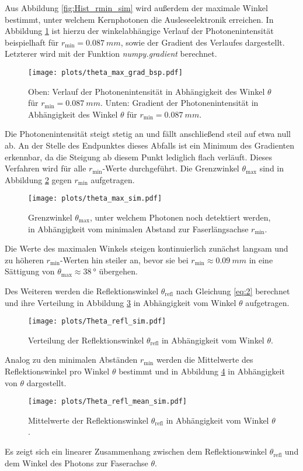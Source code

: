 Aus Abbildung \ref{fig:Hist_rmin_sim} wird außerdem der maximale Winkel bestimmt, unter welchem Kernphotonen die Ausleseelektronik erreichen. In Abbildung \ref{fig:theta_max_grad_bsp} ist hierzu der winkelabhängige Verlauf der Photonenintensität beispielhaft für $r_\mathrm{min} = \SI{0.087}{mm}$, sowie der Gradient des Verlaufes dargestellt. Letzterer wird mit der Funktion \textit{numpy.gradient} berechnet. 
\begin{figure}
    \centering
    \texttt{[image: plots/theta\_max\_grad\_bsp.pdf]}
    \caption{Oben: Verlauf der Photonenintensität in Abhängigkeit des Winkel $\theta$ für $r_\mathrm{min} = \SI{0.087}{mm}$. Unten: Gradient der Photonenintensität in Abhängigkeit des Winkel $\theta$ für $r_\mathrm{min} = \SI{0.087}{mm}$. }
    \label{fig:theta_max_grad_bsp}
\end{figure}
\FloatBarrier
Die Photonenintensität steigt stetig an und fällt anschließend steil auf etwa null ab. An der Stelle des Endpunktes dieses Abfalls ist ein Minimum des Gradienten erkennbar, da die Steigung ab diesem Punkt lediglich flach verläuft. Dieses Verfahren wird für alle $r_\mathrm{min}$-Werte durchgeführt.
Die Grenzwinkel $\theta_{\mathrm{max}}$ sind in Abbildung \ref{fig:theta_max_sim} gegen $r_{\mathrm{min}}$ aufgetragen.
\begin{figure}
    \centering
    \texttt{[image: plots/theta\_max\_sim.pdf]}
    \caption{Grenzwinkel $\theta_{\mathrm{max}}$, unter welchem Photonen noch detektiert werden, in Abhängigkeit vom minimalen Abstand zur Faserlängsachse $r_{\mathrm{min}}$. }
    \label{fig:theta_max_sim}
\end{figure}
\FloatBarrier
Die Werte des maximalen Winkels steigen kontinuierlich zunächst langsam und zu höheren $r_{\mathrm{min}}$-Werten hin steiler an, bevor sie bei $r_\mathrm{min} \approx \SI{0.09}{mm}$ in eine Sättigung von $\theta_{\mathrm{max}}\approx \SI{38}{°}$ übergehen.


Des Weiteren werden die Reflektionswinkel $\theta_{\mathrm{refl}}$ nach Gleichung \eqref{eq:2} berechnet und ihre Verteilung in Abbildung \ref{fig:Theta_refl_sim} in Abhängigkeit vom Winkel $\theta$ aufgetragen.
\begin{figure}
    \centering
    \texttt{[image: plots/Theta\_refl\_sim.pdf]}
    \caption{Verteilung der Reflektionswinkel $\theta_{\mathrm{refl}}$ in Abhängigkeit vom Winkel $\theta$. }
    \label{fig:Theta_refl_sim}
\end{figure}
\FloatBarrier
Analog zu den minimalen Abständen $r_{\mathrm{min}}$ werden die Mittelwerte des Reflektionswinkel pro Winkel $\theta$ bestimmt und in Abbildung \ref{fig:Theta_refl_mean_sim} in Abhängigkeit von $\theta$ dargestellt.
\begin{figure}
    \centering
    \texttt{[image: plots/Theta\_refl\_mean\_sim.pdf]}
    \caption{Mittelwerte der Reflektionswinkel $\theta_{\mathrm{refl}}$ in Abhängigkeit vom Winkel $\theta$. }
    \label{fig:Theta_refl_mean_sim}
\end{figure}
\FloatBarrier
Es zeigt sich ein linearer Zusammenhang zwischen dem Reflektionswinkel $\theta_{\mathrm{refl}}$ und dem Winkel des Photons zur Faserachse $\theta$.

